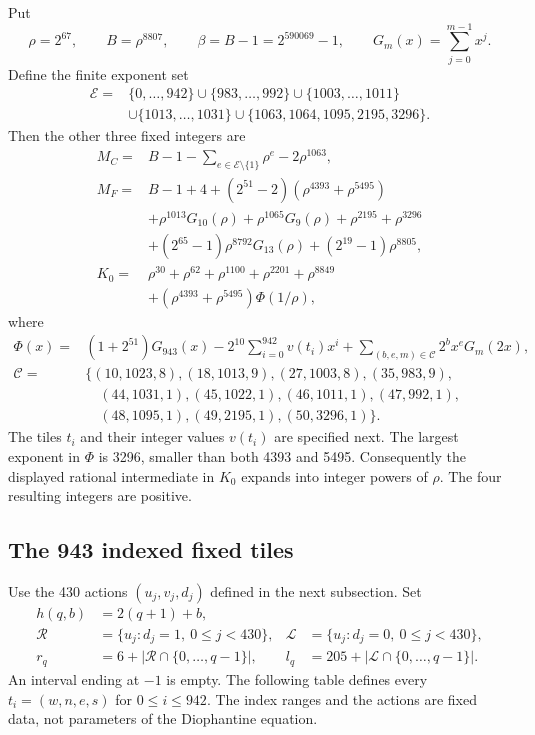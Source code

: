 Put
\[
 \rho=2^{67},\qquad B=\rho^{8807},\qquad
 \beta=B-1=2^{590069}-1,\qquad
 G_m(x)=\sum_{j=0}^{m-1}x^j.
\]
Define the finite exponent set
\begin{align*}
 \mathcal E={}&\{0,\ldots,942\}\cup\{983,\ldots,992\}
                 \cup\{1003,\ldots,1011\}\\
 &\cup\{1013,\ldots,1031\}
                 \cup\{1063,1064,1095,2195,3296\}.
\end{align*}
Then the other three fixed integers are
\begin{align*}
 M_C={}&B-1-\sum_{e\in\mathcal E\setminus\{1\}}\rho^e
                     -2\rho^{1063},\\
 M_F={}&B-1+4+(2^{51}-2)(\rho^{4393}+\rho^{5495})\\
       &+\rho^{1013}G_{10}(\rho)+\rho^{1065}G_9(\rho)
                     +\rho^{2195}+\rho^{3296}\\
       &+(2^{65}-1)\rho^{8792}G_{13}(\rho)
                     +(2^{19}-1)\rho^{8805},\\
 K_0={}&\rho^{30}+\rho^{62}+\rho^{1100}+\rho^{2201}
                     +\rho^{8849}\\
       &+(\rho^{4393}+\rho^{5495})\Phi(1/\rho),
\end{align*}
where
\begin{align*}
 \Phi(x)={}&(1+2^{51})G_{943}(x)
           -2^{10}\sum_{i=0}^{942}v(t_i)x^i
           +\sum_{(b,e,m)\in\mathcal C}2^b x^eG_m(2x),\\
 \mathcal C={}&\{(10,1023,8),(18,1013,9),(27,1003,8),
                  (35,983,9),\\
             &\quad(44,1031,1),(45,1022,1),(46,1011,1),
                  (47,992,1),\\
             &\quad(48,1095,1),(49,2195,1),(50,3296,1)\}.
\end{align*}
The tiles $t_i$ and their integer values $v(t_i)$ are specified next.
The largest exponent in $\Phi$ is 3296, smaller than both 4393 and 5495.
Consequently the displayed rational intermediate in $K_0$ expands into
integer powers of $\rho$.  The four resulting integers are positive.

\subsection{The 943 indexed fixed tiles}

Use the 430 actions $(u_j,v_j,d_j)$ defined in the next subsection.  Set
\begin{align*}
 h(q,b)&=2(q+1)+b,\\
 \mathcal R&=\{u_j:d_j=1,\ 0\leq j<430\},
 &\mathcal L&=\{u_j:d_j=0,\ 0\leq j<430\},\\
 r_q&=6+|\mathcal R\cap\{0,\ldots,q-1\}|,
 &l_q&=205+|\mathcal L\cap\{0,\ldots,q-1\}|.
\end{align*}
An interval ending at $-1$ is empty.  The following table defines every
$t_i=(w,n,e,s)$ for $0\leq i\leq942$.  The index ranges and the actions
are fixed data, not parameters of the Diophantine equation.

